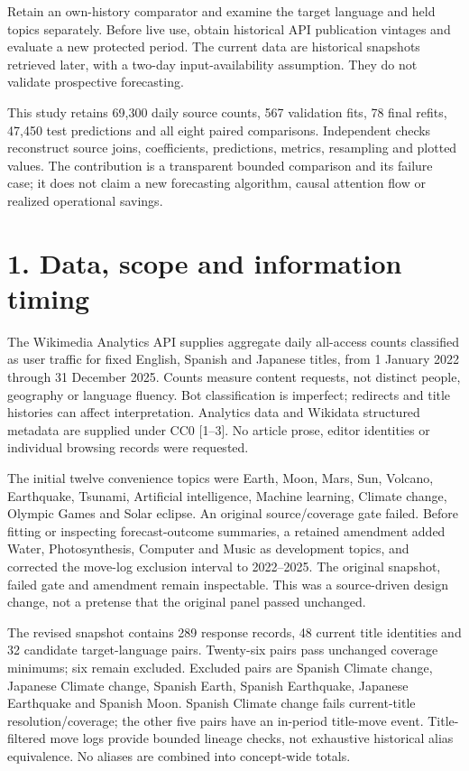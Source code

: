 \documentclass[11pt,letterpaper]{article}
\begin{document}
Retain an own-history comparator and examine the target language and held topics separately. Before live use, obtain historical API publication vintages and evaluate a new protected period. The current data are historical snapshots retrieved later, with a two-day input-availability assumption. They do not validate prospective forecasting.

This study retains 69,300 daily source counts, 567 validation fits, 78 final refits, 47,450 test predictions and all eight paired comparisons. Independent checks reconstruct source joins, coefficients, predictions, metrics, resampling and plotted values. The contribution is a transparent bounded comparison and its failure case; it does not claim a new forecasting algorithm, causal attention flow or realized operational savings.

\newpage
\section*{1. Data, scope and information timing}
The Wikimedia Analytics API supplies aggregate daily all-access counts classified as user traffic for fixed English, Spanish and Japanese titles, from 1 January 2022 through 31 December 2025. Counts measure content requests, not distinct people, geography or language fluency. Bot classification is imperfect; redirects and title histories can affect interpretation. Analytics data and Wikidata structured metadata are supplied under CC0 [1--3]. No article prose, editor identities or individual browsing records were requested.

The initial twelve convenience topics were Earth, Moon, Mars, Sun, Volcano, Earthquake, Tsunami, Artificial intelligence, Machine learning, Climate change, Olympic Games and Solar eclipse. An original source/coverage gate failed. Before fitting or inspecting forecast-outcome summaries, a retained amendment added Water, Photosynthesis, Computer and Music as development topics, and corrected the move-log exclusion interval to 2022--2025. The original snapshot, failed gate and amendment remain inspectable. This was a source-driven design change, not a pretense that the original panel passed unchanged.

The revised snapshot contains 289 response records, 48 current title identities and 32 candidate target-language pairs. Twenty-six pairs pass unchanged coverage minimums; six remain excluded. Excluded pairs are Spanish Climate change, Japanese Climate change, Spanish Earth, Spanish Earthquake, Japanese Earthquake and Spanish Moon. Spanish Climate change fails current-title resolution/coverage; the other five pairs have an in-period title-move event. Title-filtered move logs provide bounded lineage checks, not exhaustive historical alias equivalence. No aliases are combined into concept-wide totals.
\end{document}
